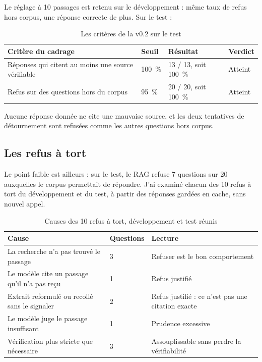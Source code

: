 \documentclass[11pt,a4paper]{article}
\begin{document}
Le réglage à 10 passages est retenu sur le développement : même taux de refus hors corpus, une réponse correcte de plus. Sur le test :

\begin{table}[H]
\centering\small
\begin{tabularx}{\linewidth}{@{}Y l l l@{}}
\toprule
Critère du cadrage & Seuil & Résultat & Verdict \\
\midrule
Réponses qui citent au moins une source vérifiable & 100~\% & 13 / 13, soit 100~\% & Atteint \\
Refus sur des questions hors du corpus & 95~\% & 20 / 20, soit 100~\% & Atteint \\
\bottomrule
\end{tabularx}
\caption{Les critères de la v0.2 sur le test}
\end{table}

Aucune réponse donnée ne cite une mauvaise source, et les deux tentatives de détournement sont refusées comme les autres questions hors corpus.

\subsection{Les refus à tort}

Le point faible est ailleurs : sur le test, le RAG refuse 7 questions sur 20 auxquelles le corpus permettait de répondre. J'ai examiné chacun des 10 refus à tort du développement et du test, à partir des réponses gardées en cache, sans nouvel appel.

\begin{table}[H]
\centering\small
\begin{tabularx}{\linewidth}{@{}Y l Y@{}}
\toprule
Cause & Questions & Lecture \\
\midrule
La recherche n'a pas trouvé le passage & 3 & Refuser est le bon comportement \\
Le modèle cite un passage qu'il n'a pas reçu & 1 & Refus justifié \\
Extrait reformulé ou recollé sans le signaler & 2 & Refus justifié : ce n'est pas une citation exacte \\
Le modèle juge le passage insuffisant & 1 & Prudence excessive \\
Vérification plus stricte que nécessaire & 3 & Assouplissable sans perdre la vérifiabilité \\
\bottomrule
\end{tabularx}
\caption{Causes des 10 refus à tort, développement et test réunis}
\end{table}
\end{document}
